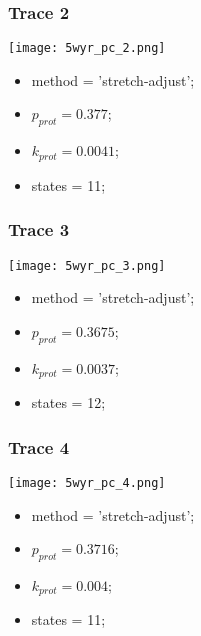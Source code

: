 \subsubsection{Trace 2}
\begin{minipage}[c]{0.7\textwidth}
    \texttt{[image: 5wyr\_pc\_2.png]}
\end{minipage}
\hfill
\begin{minipage}[c]{0.45\textwidth}
    \begin{itemize}
        \item method = 'stretch-adjust';
        \item $p_{prot}=0.377$;
        \item $k_{prot}=0.0041$;
        \item states = 11;
    \end{itemize}
\end{minipage}

\subsubsection{Trace 3}
\begin{minipage}[c]{0.7\textwidth}
    \texttt{[image: 5wyr\_pc\_3.png]}
\end{minipage}
\hfill
\begin{minipage}[c]{0.45\textwidth}
    \begin{itemize}
        \item method = 'stretch-adjust';
        \item $p_{prot}=0.3675$;
        \item $k_{prot}=0.0037$;
        \item states = 12;
    \end{itemize}
\end{minipage}

\subsubsection{Trace 4}
\begin{minipage}[c]{0.7\textwidth}
    \texttt{[image: 5wyr\_pc\_4.png]}
\end{minipage}
\hfill
\begin{minipage}[c]{0.45\textwidth}
    \begin{itemize}
        \item method = 'stretch-adjust';
        \item $p_{prot}=0.3716$;
        \item $k_{prot}=0.004$;
        \item states = 11;
    \end{itemize}
\end{minipage}

